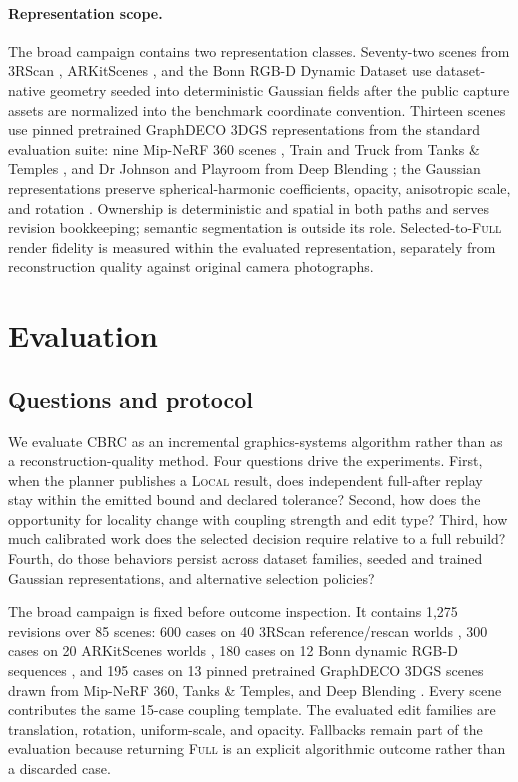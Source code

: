 \documentclass[acmtog,nonacm]{acmart}
\newcommand{\method}{CBRC}
\newcommand{\FULL}{\textsc{Full}}
\newcommand{\LOCAL}{\textsc{Local}}
\begin{document}
\paragraph{Representation scope.}
The broad campaign contains two representation classes. Seventy-two scenes from 3RScan \citep{wald2019rio}, ARKitScenes \citep{baruch2021arkitscenes}, and the Bonn RGB-D Dynamic Dataset \citep{palazzolo2019refusion} use dataset-native geometry seeded into deterministic Gaussian fields after the public capture assets are normalized into the benchmark coordinate convention. Thirteen scenes use pinned pretrained GraphDECO 3DGS representations from the standard evaluation suite: nine Mip-NeRF 360 scenes \citep{barron2022mipnerf360}, Train and Truck from Tanks \& Temples \citep{knapitsch2017tandt}, and Dr Johnson and Playroom from Deep Blending \citep{hedman2018deepblending}; the Gaussian representations preserve spherical-harmonic coefficients, opacity, anisotropic scale, and rotation \citep{kerbl2023gaussians}. Ownership is deterministic and spatial in both paths and serves revision bookkeeping; semantic segmentation is outside its role. Selected-to-\FULL{} render fidelity is measured within the evaluated representation, separately from reconstruction quality against original camera photographs.

\section{Evaluation}
\subsection{Questions and protocol}
We evaluate \method{} as an incremental graphics-systems algorithm rather than as a reconstruction-quality method. Four questions drive the experiments. First, when the planner publishes a \LOCAL{} result, does independent full-after replay stay within the emitted bound and declared tolerance? Second, how does the opportunity for locality change with coupling strength and edit type? Third, how much calibrated work does the selected decision require relative to a full rebuild? Fourth, do those behaviors persist across dataset families, seeded and trained Gaussian representations, and alternative selection policies?

The broad campaign is fixed before outcome inspection. It contains 1,275 revisions over 85 scenes: 600 cases on 40 3RScan reference/rescan worlds \citep{wald2019rio}, 300 cases on 20 ARKitScenes worlds \citep{baruch2021arkitscenes}, 180 cases on 12 Bonn dynamic RGB-D sequences \citep{palazzolo2019refusion}, and 195 cases on 13 pinned pretrained GraphDECO 3DGS scenes drawn from Mip-NeRF 360, Tanks \& Temples, and Deep Blending \citep{kerbl2023gaussians,barron2022mipnerf360,knapitsch2017tandt,hedman2018deepblending}. Every scene contributes the same 15-case coupling template. The evaluated edit families are translation, rotation, uniform-scale, and opacity. Fallbacks remain part of the evaluation because returning \FULL{} is an explicit algorithmic outcome rather than a discarded case.
\end{document}
